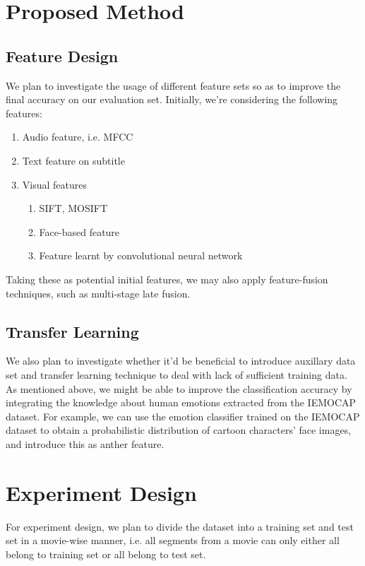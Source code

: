 \documentclass[a4page]{article}
\begin{document}
\section{Proposed Method}

\subsection{Feature Design}
We plan to investigate the usage of different feature sets so as to improve the final accuracy on our evaluation set. Initially, we're considering the following features:

\begin{enumerate}
\item Audio feature, i.e. MFCC
\item Text feature on subtitle
\item Visual features
    \begin{enumerate}
    \item SIFT, MOSIFT
    \item Face-based feature
    \item Feature learnt by convolutional neural network
    \end{enumerate}
\end{enumerate}

Taking these as potential initial features, we may also apply feature-fusion techniques, such as multi-stage late fusion. 

\subsection{Transfer Learning}

We also plan to investigate whether it'd be beneficial to introduce auxillary data set and transfer learning technique to deal with lack of sufficient training data. As mentioned above, we might be able to improve the classification accuracy by integrating the knowledge about human emotions extracted from the IEMOCAP dataset. For example, we can use the emotion classifier trained on the IEMOCAP dataset to obtain a probabilistic distribution of cartoon characters' face images, and introduce this as anther feature. 

\section{Experiment Design}

For experiment design, we plan to divide the dataset into a training set and test set in a movie-wise manner, i.e. all segments from a movie can only either all belong to training set or all belong to test set. \\
\end{document}
